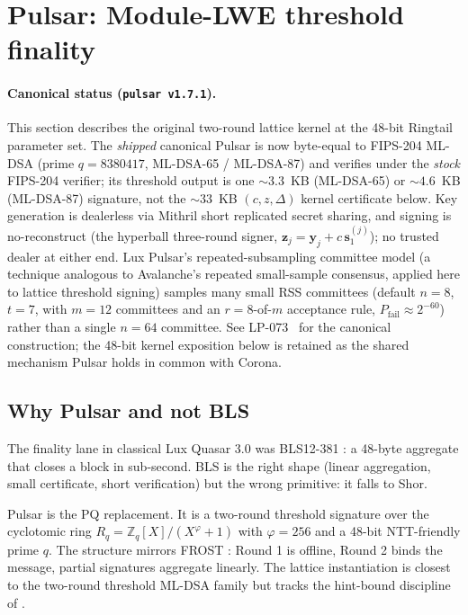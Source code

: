 \section{Pulsar: Module-LWE threshold finality}
\label{sec:pulsar}

\paragraph{Canonical status (\texttt{pulsar v1.7.1}).} This section
describes the original two-round lattice kernel at the 48-bit Ringtail
parameter set. The \emph{shipped} canonical Pulsar is now byte-equal to
FIPS-204 ML-DSA (prime $q = 8380417$, ML-DSA-65 / ML-DSA-87) and verifies
under the \emph{stock} FIPS-204 verifier; its threshold output is one
$\sim 3.3$~KB (ML-DSA-65) or $\sim 4.6$~KB (ML-DSA-87) signature, not the
$\sim 33$~KB $(c,z,\Delta)$ kernel certificate below. Key generation is
dealerless via Mithril short replicated secret sharing, and signing is
no-reconstruct (the hyperball three-round signer,
$\mathbf{z}_j = \mathbf{y}_j + c\,\mathbf{s}_1^{(j)}$); no trusted dealer
at either end. Lux Pulsar's repeated-subsampling committee model (a
technique analogous to Avalanche's repeated small-sample consensus,
applied here to lattice threshold signing) samples many small
RSS committees (default $n{=}8$, $t{=}7$, with $m{=}12$ committees and an
$r{=}8$-of-$m$ acceptance rule, $P_{\text{fail}} \approx 2^{-60}$) rather
than a single $n{=}64$ committee. See LP-073~\cite{lp073} for the canonical
construction; the 48-bit kernel exposition below is retained as the shared
mechanism Pulsar holds in common with Corona.

\subsection{Why Pulsar and not BLS}

The finality lane in classical Lux Quasar 3.0 \cite{lp020} was BLS12-381
\cite{bls}: a 48-byte aggregate that closes a block in sub-second. BLS is the
right shape (linear aggregation, small certificate, short verification) but
the wrong primitive: it falls to Shor.

Pulsar is the PQ replacement. It is a two-round threshold signature over
the cyclotomic ring $R_q = \mathbb{Z}_q[X]/(X^\varphi+1)$ with $\varphi=256$
and a 48-bit NTT-friendly prime $q$. The structure mirrors FROST
\cite{frost}: Round 1 is offline, Round 2 binds the message, partial
signatures aggregate linearly. The lattice instantiation is closest to the
two-round threshold ML-DSA family \cite{tmldsa2025,dttf2024} but tracks the
hint-bound discipline of \cite{ringtail}.

